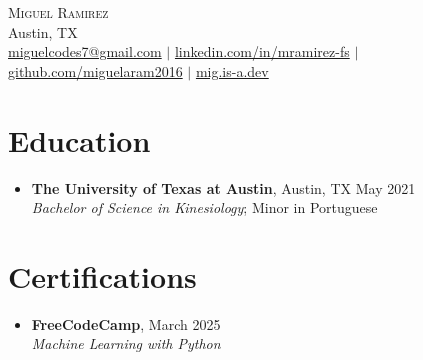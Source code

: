 \documentclass[letterpaper,10pt]{article}
\begin{document}
\begin{center}
  {\Huge \scshape Miguel Ramirez} \\ \vspace{1pt}
  Austin, TX \\ 
  \href{mailto:miguelcodes7@gmail.com}{miguelcodes7@gmail.com} $|$
  \href{https://linkedin.com/in/mramirez-fs}{linkedin.com/in/mramirez-fs} $|$
  \href{https://github.com/miguelaram2016}{github.com/miguelaram2016} $|$
  \href{https://mig.is-a.dev}{mig.is-a.dev}
\end{center}

\section*{Education}
\begin{itemize}[leftmargin=0.15in]
  \item[]
    \textbf{The University of Texas at Austin}, Austin, TX \hfill May 2021 \\
    \textit{Bachelor of Science in Kinesiology}; Minor in Portuguese

\end{itemize}

\section*{Certifications}
\begin{itemize}[leftmargin=0.15in]
  \item[]
    \textbf{FreeCodeCamp}, \hfill March 2025 \\
    \textit{Machine Learning with Python} \
\end{itemize}

\end{document}
